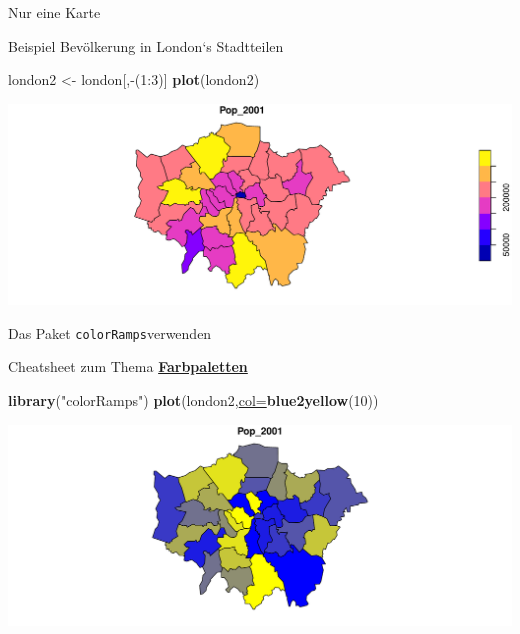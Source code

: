 \documentclass[ignorenonframetext,]{beamer}
\newenvironment{Shaded}{\begin{snugshade}}{\end{snugshade}}
\newcommand{\DataTypeTok}[1]{\textcolor[rgb]{0.74,0.68,0.62}{\underline{#1}}}
\newcommand{\DecValTok}[1]{\textcolor[rgb]{0.27,0.67,0.26}{#1}}
\newcommand{\KeywordTok}[1]{\textcolor[rgb]{0.26,0.66,0.93}{\textbf{#1}}}
\newcommand{\NormalTok}[1]{\textcolor[rgb]{0.74,0.68,0.62}{#1}}
\newcommand{\OperatorTok}[1]{\textcolor[rgb]{0.74,0.68,0.62}{#1}}
\newcommand{\StringTok}[1]{\textcolor[rgb]{0.02,0.61,0.04}{#1}}
\begin{document}
\begin{frame}[fragile]{Nur eine Karte}
\protect\hypertarget{nur-eine-karte}{}

\begin{block}{Beispiel Bevölkerung in London`s Stadtteilen}

\begin{Shaded}
\begin{Highlighting}[]
\NormalTok{london2 <-}\StringTok{ }\NormalTok{london[,}\OperatorTok{-}\NormalTok{(}\DecValTok{1}\OperatorTok{:}\DecValTok{3}\NormalTok{)]}
\KeywordTok{plot}\NormalTok{(london2)}
\end{Highlighting}
\end{Shaded}

\includegraphics{B7_simplefeatures_files/figure-beamer/unnamed-chunk-11-1.pdf}

\end{block}

\end{frame}

\begin{frame}[fragile]{Das Paket \texttt{colorRamps}verwenden}
\protect\hypertarget{das-paket-colorrampsverwenden}{}

\begin{block}{Cheatsheet zum Thema
\href{https://www.nceas.ucsb.edu/~frazier/RSpatialGuides/colorPaletteCheatsheet.pdf}{\textbf{Farbpaletten}}}

\begin{Shaded}
\begin{Highlighting}[]
\KeywordTok{library}\NormalTok{(}\StringTok{"colorRamps"}\NormalTok{)}
\KeywordTok{plot}\NormalTok{(london2,}\DataTypeTok{col=}\KeywordTok{blue2yellow}\NormalTok{(}\DecValTok{10}\NormalTok{))}
\end{Highlighting}
\end{Shaded}

\includegraphics{B7_simplefeatures_files/figure-beamer/unnamed-chunk-12-1.pdf}

\end{block}

\end{frame}
\end{document}
